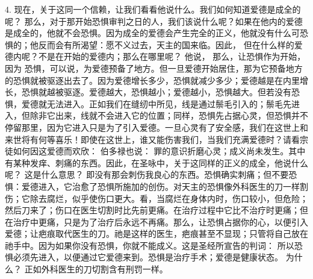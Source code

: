 4. 现在，关于这同一个信赖，让我们看看他说什么。我们如何知道爱德是成全的呢？ 那么，对于那开始恐惧审判之日的人，我们该说什么呢？如果在他内的爱德是成全的，他就不会恐惧。因为成全的爱德会产生完全的正义，他就没有什么可恐惧的；他反而会有所渴望：愿不义过去，天主的国来临。因此， 但在什么样的爱德内呢？不是在开始的爱德内；那么在哪里呢？ 他说， 那么，让恐惧作为开始，因为 恐惧，可以说，为爱德预备了地方。但一旦爱德开始居住，那为它预备地方的恐惧就被驱逐出去了。因为爱德增长多少，恐惧就减少多少；爱德越是在内里增长，恐惧就越被驱逐。爱德越大，恐惧越小；爱德越小，恐惧越大。但若没有恐惧，爱德就无法进入。正如我们在缝纫中所见，线是通过鬃毛引入的；鬃毛先进入，但除非它出来，线就不会进入它的位置；同样，恐惧先占据心灵，但恐惧并不停留那里，因为它进入只是为了引入爱德。一旦心灵有了安全感，我们在这世上和来世将有何等喜乐！即使在这世上，谁又能伤害我们，当我们充满爱德时？请看宗徒如何因这爱德而欢欣： 伯多禄也说： 罪的意识折磨心灵；成义尚未发生。其中有某种发痒、刺痛的东西。因此，在圣咏中，关于这同样的正义的成全，他说什么呢？ 这是什么意思？ 即没有那会刺伤我良心的东西。恐惧确实刺痛；但不要恐惧：爱德进入，它治愈了恐惧所施加的创伤。对天主的恐惧像外科医生的刀一样割伤；它除去腐烂，似乎使伤口更大。看，当腐烂在身体内时，伤口较小，但危险；然后刀来了；伤口在医生切割时比先前更痛。在治疗过程中它比不治疗时更痛；但在治疗中更痛，只是为了治疗后永远不再痛。那么，让恐惧占据你的心，以便引入爱德；让疤痕取代医生的刀。祂是这样的医生，疤痕甚至不显现；只管将自己放在祂手中。因为如果你没有恐惧，你就不能成义。这是圣经所宣告的判词： 所以恐惧必须先进入，以便通过它爱德来到。恐惧是治疗手术；爱德是健康状态。 为什么？ 正如外科医生的刀切割含有刑罚一样。\par


